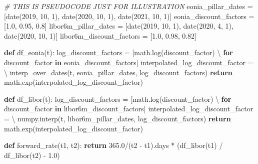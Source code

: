 \documentclass[11pt]{article}
\newenvironment{Shaded}{}{}
\newcommand{\KeywordTok}[1]{\textcolor[rgb]{0.00,0.44,0.13}{\textbf{{#1}}}}
\newcommand{\DecValTok}[1]{\textcolor[rgb]{0.25,0.63,0.44}{{#1}}}
\newcommand{\FloatTok}[1]{\textcolor[rgb]{0.25,0.63,0.44}{{#1}}}
\newcommand{\CommentTok}[1]{\textcolor[rgb]{0.38,0.63,0.69}{\textit{{#1}}}}
\newcommand{\NormalTok}[1]{{#1}}
\newcommand{\ControlFlowTok}[1]{\textcolor[rgb]{0.00,0.44,0.13}{\textbf{{#1}}}}
\newcommand{\OperatorTok}[1]{\textcolor[rgb]{0.40,0.40,0.40}{{#1}}}
\begin{document}
    \begin{Shaded}
\begin{Highlighting}[]
\CommentTok{# THIS IS PSEUDOCODE JUST FOR ILLUSTRATION}
\NormalTok{eonia_pillar_dates }\OperatorTok{=}\NormalTok{ [date(}\DecValTok{2019}\NormalTok{, }\DecValTok{10}\NormalTok{, }\DecValTok{1}\NormalTok{), }
\NormalTok{                      date(}\DecValTok{2020}\NormalTok{, }\DecValTok{10}\NormalTok{, }\DecValTok{1}\NormalTok{),  }
\NormalTok{                      date(}\DecValTok{2021}\NormalTok{, }\DecValTok{10}\NormalTok{, }\DecValTok{1}\NormalTok{)]}
\NormalTok{eonia_discount_factors }\OperatorTok{=}\NormalTok{ [}\FloatTok{1.0}\NormalTok{, }\FloatTok{0.95}\NormalTok{, }\FloatTok{0.8}\NormalTok{]}
\NormalTok{libor6m_pillar_dates }\OperatorTok{=}\NormalTok{ [date(}\DecValTok{2019}\NormalTok{, }\DecValTok{10}\NormalTok{, }\DecValTok{1}\NormalTok{),  }
\NormalTok{                        date(}\DecValTok{2020}\NormalTok{, }\DecValTok{4}\NormalTok{, }\DecValTok{1}\NormalTok{),  }
\NormalTok{                        date(}\DecValTok{2020}\NormalTok{, }\DecValTok{10}\NormalTok{, }\DecValTok{1}\NormalTok{)]}
\NormalTok{libor6m_discount_factors }\OperatorTok{=}\NormalTok{ [}\FloatTok{1.0}\NormalTok{, }\FloatTok{0.98}\NormalTok{, }\FloatTok{0.82}\NormalTok{]}

\KeywordTok{def}\NormalTok{ df_eonia(t):}
\NormalTok{    log_discount_factors }\OperatorTok{=}\NormalTok{ [math.log(discount_factor) }\OperatorTok{\textbackslash{}}
       \ControlFlowTok{for}\NormalTok{ discount_factor }\KeywordTok{in}\NormalTok{ eonia_discount_factors]}
\NormalTok{    interpolated_log_discount_factor }\OperatorTok{=} \OperatorTok{\textbackslash{}}
\NormalTok{       interp_over_dates(t, eonia_pillar_dates, }
\NormalTok{                         log_discount_factors)}
    \ControlFlowTok{return}\NormalTok{ math.exp(interpolated_log_discount_factor)}

\KeywordTok{def}\NormalTok{ df_libor(t):}
\NormalTok{    log_discount_factors }\OperatorTok{=}\NormalTok{ [math.log(discount_factor) }\OperatorTok{\textbackslash{}}
       \ControlFlowTok{for}\NormalTok{ discount_factor }\KeywordTok{in}\NormalTok{ libor6m_discount_factors]}
\NormalTok{    interpolated_log_discount_factor }\OperatorTok{=} \OperatorTok{\textbackslash{}}
\NormalTok{        numpy.interp(t, libor6m_pillar_dates, log_discount_factors)}
    \ControlFlowTok{return}\NormalTok{ math.exp(interpolated_log_discount_factor)}

\KeywordTok{def}\NormalTok{ forward_rate(t1, t2):}
    \ControlFlowTok{return} \FloatTok{365.0}\OperatorTok{/}\NormalTok{(t2 }\OperatorTok{-}\NormalTok{ t1).days }\OperatorTok{*}\NormalTok{ (df_libor(t1) }\OperatorTok{/}\NormalTok{ df_libor(t2) }\OperatorTok{-} \FloatTok{1.0}\NormalTok{)}


\end{Highlighting}
\end{Shaded}
\end{document}
